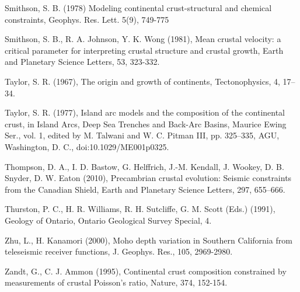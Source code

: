 \documentclass[review]{elsarticle}
\begin{document}
Smithson, S. B. (1978) Modeling continental crust-structural and chemical constraints, Geophys. Res. Lett. 5(9), 749-775

Smithson, S. B., R. A. Johnson, Y. K. Wong (1981), Mean crustal velocity: a critical parameter for interpreting crustal structure and crustal growth, Earth and Planetary Science Letters, 53, 323-332.

Taylor, S. R. (1967), The origin and growth of continents, Tectonophysics, 4, 17–34.

Taylor, S. R. (1977), Island arc models and the composition of the continental crust, in Island Arcs, Deep Sea Trenches and Back-Arc Basins, Maurice Ewing Ser., vol. 1, edited by M. Talwani and W. C. Pitman III, pp. 325–335, AGU, Washington, D. C., doi:10.1029/ME001p0325.

Thompson, D. A., I. D. Bastow, G. Helffrich, J.-M. Kendall, J. Wookey, D. B. Snyder, D. W. Eaton (2010), Precambrian crustal evolution: Seismic constraints from the Canadian Shield, Earth and Planetary Science Letters, 297, 655–666.

Thurston, P. C., H. R. Williams, R. H. Sutcliffe, G. M. Scott (Eds.) (1991), Geology of Ontario, Ontario Geological Survey Special, 4.

Zhu, L., H. Kanamori (2000), Moho depth variation in Southern California from teleseismic receiver functions, J. Geophys. Res., 105, 2969-2980.

Zandt, G., C. J. Ammon (1995), Continental crust composition constrained by measurements of crustal Poisson's ratio, Nature, 374, 152-154.
\end{document}
